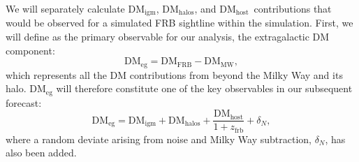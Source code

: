\documentclass[twocolumn]{aastex63}
\newcommand{\dm}{\ensuremath{\mathrm{DM}}}
\newcommand{\dmhalo}{\ensuremath{\mathrm{DM}_\mathrm{halos}}}
\newcommand{\dmigm}{\ensuremath{\mathrm{DM}_\mathrm{igm}}}
\newcommand{\dmmw}{\ensuremath{\mathrm{DM}_\mathrm{MW}}}
\newcommand{\dmhost}{\ensuremath{\mathrm{DM}_\mathrm{host}}}
\newcommand{\zfrb}{\ensuremath{z_\mathrm{frb}}}
\begin{document}
\begin{CJK*}{UTF8}{gbsn}
We will separately calculate \dmigm, \dmhalo, and \dmhost\ contributions that would be observed for a simulated FRB sightline within the simulation.
First, we will define as the primary observable for our analysis, the extragalactic DM component:
\begin{equation}
\mathrm{DM}_\mathrm{eg}  =  \dm_\mathrm{FRB} - \dmmw,
\end{equation}
which represents all the DM contributions from beyond the Milky Way and its halo.
$\mathrm{DM}_\mathrm{eg}$ will therefore constitute one of the key observables in our subsequent forecast:
\begin{equation}\label{eq:dm_eg}
\mathrm{DM}_\mathrm{eg} = \dmigm + \dmhalo + \frac{\dmhost}{1+\zfrb} + \delta_N,
\end{equation}
where a random deviate arising from noise and Milky Way subtraction, $\delta_N$, has also been added.


\end{CJK*}
\end{document}
